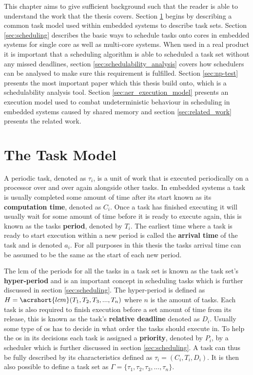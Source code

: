 \documentclass{kththesis}
\begin{document}
This chapter aims to give sufficient background such that the reader is able to understand the work
that the thesis covers. Section \ref{sec:the_task_model} begins by describing a common task model
used within embedded systems to describe task sets. Section \ref{sec:scheduling} describes the basic
ways to schedule tasks onto cores in embedded systems for single core as well as multi-core systems.
When used in a real product it is important that a scheduling algorithm is able to scheduled a task
set without any missed deadlines, section \ref{sec:schedulability_analysis} covers how schedulers
can be analysed to make sure this requirement is fulfilled. Section \ref{sec:np-test} presents the
most important paper which this thesis build onto, which is a schedulability analysis tool. Section
\ref{sec:aer_execution_model} presents an execution model used to combat undeterministic behaviour
in scheduling in embedded systems caused by shared memory and section \ref{sec:related_work}
presents the related work.


\section{The Task Model} \label{sec:the_task_model}

A periodic task, denoted as $\tau_i$, is a unit of work that is executed periodically on a processor
over and over again alongside other tasks. In embedded systems a task is usually completed some
amount of time after its start known as its \textbf{computation time}, denoted as $C_i$. Once a task
has finished executing it will usually wait for some amount of time before it is ready to execute
again, this is known as the tasks \textbf{period}, denoted by $T_i$. The earliest time where a task
is ready to start execution within a new period is called the \textbf{arrival time} of the task and
is denoted $ a_i $. For all purposes in this thesis the tasks arrival time can be assumed to be the
same as the start of each new period.

The \acrshort{lcm} of the periods for all the tasks in a task set is known as the task set's
\textbf{hyper-period} and is an important concept in scheduling tasks which is further discussed
in section \ref{sec:scheduling}. The hyper-period is defined as $H = \acrshort{lcm}(T_1, T_2, T_3,
..., T_n)$ where $n$ is the amount of tasks. Each task is also required to finish execution before a
set amount of time from its release, this is known as the task's \textbf{relative deadline} denoted
as $D_i$. Usually some type of \acrshort{os} has to decide in what order the tasks should execute
in. To help the \acrshort{os} in its decisions each task is assigned a \textbf{priority}, denoted by
$P_i$, by a scheduler which is further discussed in section \ref{sec:scheduling}. A task can thus
be fully described by its characteristics defined as $\tau_i = (C_i, T_i, D_i)$. It is then also
possible to define a task set as $ \Gamma = \{\tau_1, \tau_2, \tau_3, ..., \tau_n\} $. 
\end{document}
